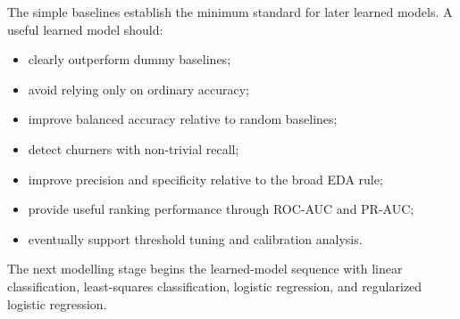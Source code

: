 The simple baselines establish the minimum standard for later learned models. A useful learned model should:
\begin{itemize}
    \item clearly outperform dummy baselines;
    \item avoid relying only on ordinary accuracy;
    \item improve balanced accuracy relative to random baselines;
    \item detect churners with non-trivial recall;
    \item improve precision and specificity relative to the broad EDA rule;
    \item provide useful ranking performance through ROC-AUC and PR-AUC;
    \item eventually support threshold tuning and calibration analysis.
\end{itemize}

The next modelling stage begins the learned-model sequence with linear classification, least-squares classification, logistic regression, and regularized logistic regression.
